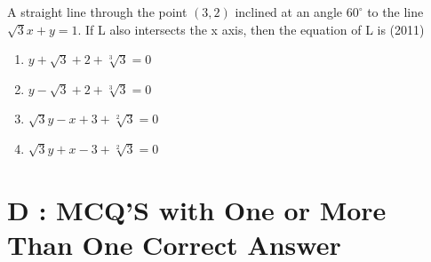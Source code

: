\documentclass[12pt]{article}
\begin{document}
\item A straight line through the point $(3,2)$ inclined at an angle $60^\circ$  to the line $\sqrt{3}x+y=1$. If L also intersects the x axis, then the equation of L is (2011)
\begin{enumerate}
\item $y+\sqrt{3}+2+\sqrt[3]{3}=0$
\item $y-\sqrt{3}+2+\sqrt[3]{3}=0$ 
\item $\sqrt{3}y-x+3+\sqrt[2]{3}=0$  
\item $\sqrt{3}y+x-3+\sqrt[2]{3}=0$
\end{enumerate}

\section*{D  :  MCQ'S with One or More Than One Correct Answer}
\end{document}

